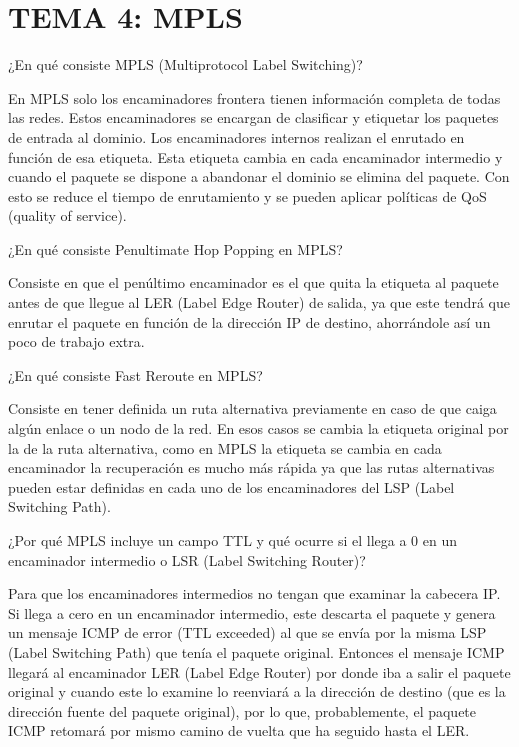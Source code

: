 \documentclass[]{article}
\begin{document}
\hypertarget{tema-4-mpls}{%
\section{TEMA 4: MPLS}\label{tema-4-mpls}}

¿En qué consiste MPLS (Multiprotocol Label Switching)?

En MPLS solo los encaminadores frontera tienen información completa de
todas las redes. Estos encaminadores se encargan de clasificar y
etiquetar los paquetes de entrada al dominio. Los encaminadores internos
realizan el enrutado en función de esa etiqueta. Esta etiqueta cambia en
cada encaminador intermedio y cuando el paquete se dispone a abandonar
el dominio se elimina del paquete. Con esto se reduce el tiempo de
enrutamiento y se pueden aplicar políticas de QoS (quality of service).

¿En qué consiste Penultimate Hop Popping en MPLS?

Consiste en que el penúltimo encaminador es el que quita la etiqueta al
paquete antes de que llegue al LER (Label Edge Router) de salida, ya que
este tendrá que enrutar el paquete en función de la dirección IP de
destino, ahorrándole así un poco de trabajo extra.

¿En qué consiste Fast Reroute en MPLS?

Consiste en tener definida un ruta alternativa previamente en caso de
que caiga algún enlace o un nodo de la red. En esos casos se cambia la
etiqueta original por la de la ruta alternativa, como en MPLS la
etiqueta se cambia en cada encaminador la recuperación es mucho más
rápida ya que las rutas alternativas pueden estar definidas en cada uno
de los encaminadores del LSP (Label Switching Path).

¿Por qué MPLS incluye un campo TTL y qué ocurre si el llega a 0 en un
encaminador intermedio o LSR (Label Switching Router)?

Para que los encaminadores intermedios no tengan que examinar la
cabecera IP. Si llega a cero en un encaminador intermedio, este descarta
el paquete y genera un mensaje ICMP de error (TTL exceeded) al que se
envía por la misma LSP (Label Switching Path) que tenía el paquete
original. Entonces el mensaje ICMP llegará al encaminador LER (Label
Edge Router) por donde iba a salir el paquete original y cuando este lo
examine lo reenviará a la dirección de destino (que es la dirección
fuente del paquete original), por lo que, probablemente, el paquete ICMP
retomará por mismo camino de vuelta que ha seguido hasta el LER.
\end{document}
